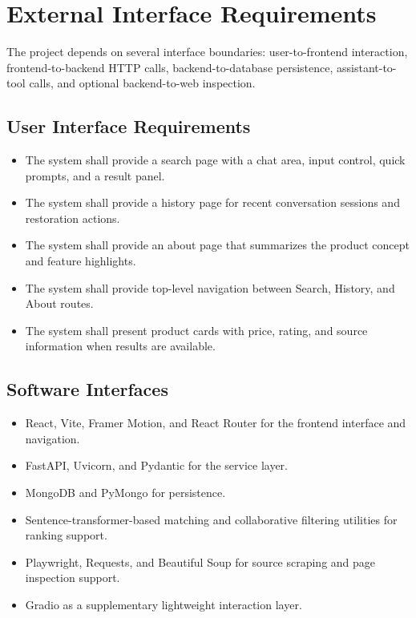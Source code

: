 \documentclass[12pt,a4paper,oneside]{report}
\begin{document}
\section{External Interface Requirements}
The project depends on several interface boundaries: user-to-frontend interaction, frontend-to-backend HTTP calls, backend-to-database persistence, assistant-to-tool calls, and optional backend-to-web inspection.

\subsection{User Interface Requirements}
\begin{itemize}[leftmargin=0.35in]
    \item The system shall provide a search page with a chat area, input control, quick prompts, and a result panel.
    \item The system shall provide a history page for recent conversation sessions and restoration actions.
    \item The system shall provide an about page that summarizes the product concept and feature highlights.
    \item The system shall provide top-level navigation between Search, History, and About routes.
    \item The system shall present product cards with price, rating, and source information when results are available.
\end{itemize}

\subsection{Software Interfaces}
\begin{itemize}[leftmargin=0.35in]
    \item React, Vite, Framer Motion, and React Router for the frontend interface and navigation.
    \item FastAPI, Uvicorn, and Pydantic for the service layer.
    \item MongoDB and PyMongo for persistence.
    \item Sentence-transformer-based matching and collaborative filtering utilities for ranking support.
    \item Playwright, Requests, and Beautiful Soup for source scraping and page inspection support.
    \item Gradio as a supplementary lightweight interaction layer.
\end{itemize}
\end{document}
